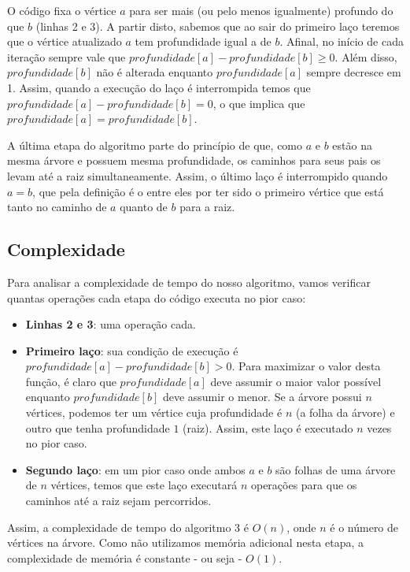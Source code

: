 O código fixa o vértice $a$ para ser mais (ou pelo menos igualmente) profundo do que $b$ (linhas 2 e 3). A partir disto, sabemos que ao sair do primeiro laço teremos que o vértice atualizado $a$ tem profundidade igual a de $b$. Afinal, no início de cada iteração sempre vale que $profundidade[a] - profundidade[b] \geq 0$. Além disso, $profundidade[b]$ não é alterada enquanto $profundidade[a]$ sempre decresce em 1. Assim, quando a execução do laço é interrompida temos que $profundidade[a] - profundidade[b] = 0$, o que implica que  $profundidade[a] = profundidade[b]$.

A última etapa do algoritmo parte do princípio de que, como $a$ e $b$ estão na mesma árvore e possuem mesma profundidade, os caminhos para seus pais os levam até a raiz simultaneamente. Assim, o último laço é interrompido quando $a = b$, que pela definição é o \LCA entre eles por ter sido o primeiro vértice que está tanto no caminho de $a$ quanto de $b$ para a raiz.


\subsection{Complexidade}

Para analisar a complexidade de tempo do nosso algoritmo, vamos verificar quantas operações cada etapa do código executa no pior caso:

\begin{itemize}
    \item \textbf{Linhas 2 e 3}: uma operação cada.
    \item \textbf{Primeiro laço}: sua condição de execução é $profundidade[a] - profundidade[b] > 0$. Para maximizar o valor desta função, é claro que $profundidade[a]$ deve assumir o maior valor possível enquanto $profundidade[b]$ deve assumir o menor. Se a árvore possui $n$ vértices, podemos ter um vértice cuja profundidade é $n$ (a folha da árvore) e outro que tenha profundidade $1$ (raiz). Assim, este laço é executado $n$ vezes no pior caso.
    \item \textbf{Segundo laço}: em um pior caso onde ambos $a$ e $b$ são folhas de uma árvore de $n$ vértices, temos que este laço executará $n$ operações para que os caminhos até a raiz sejam percorridos.
\end{itemize}

Assim, a complexidade de tempo do algoritmo 3 é $O(n)$, onde $n$ é o número de vértices na árvore. Como não utilizamos memória adicional nesta etapa, a complexidade de memória é constante - ou seja - $O(1)$.



